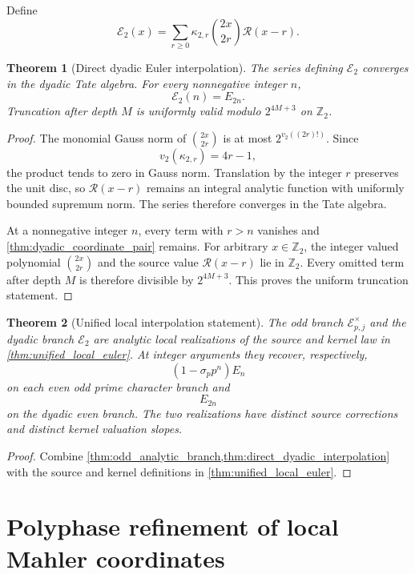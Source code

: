 \documentclass{aomart}
\newtheorem{theorem}{Theorem}[section]
\theoremstyle{definition}
\theoremstyle{remark}
\newcommand{\vTwo}{v_2}
\begin{document}
Define
\[
\boxed{
\mathscr E_2(x)
=
\sum_{r\geq0}
\kappa_{2,r}
\binom{2x}{2r}
\mathscr R(x-r).
}
\]

\begin{theorem}[Direct dyadic Euler interpolation]\label{thm:direct_dyadic_interpolation}
The series defining \(\mathscr E_2\) converges in the dyadic Tate algebra. For every nonnegative integer \(n\),
\[
\boxed{\mathscr E_2(n)=E_{2n}.}
\]
Truncation after depth \(M\) is uniformly valid modulo \(2^{4M+3}\) on \(\mathbb Z_2\).
\end{theorem}

\begin{proof}
The monomial Gauss norm of \(\binom{2x}{2r}\) is at most \(2^{\vTwo((2r)!)}\). Since
\[
\vTwo(\kappa_{2,r})=4r-1,
\]
the product tends to zero in Gauss norm. Translation by the integer \(r\) preserves the unit disc, so \(\mathscr R(x-r)\) remains an integral analytic function with uniformly bounded supremum norm. The series therefore converges in the Tate algebra.

At a nonnegative integer \(n\), every term with \(r>n\) vanishes and \cref{thm:dyadic_coordinate_pair} remains. For arbitrary \(x\in\mathbb Z_2\), the integer valued polynomial \(\binom{2x}{2r}\) and the source value \(\mathscr R(x-r)\) lie in \(\mathbb Z_2\). Every omitted term after depth \(M\) is therefore divisible by \(2^{4M+3}\). This proves the uniform truncation statement.
\end{proof}

\begin{theorem}[Unified local interpolation statement]\label{thm:unified_local_interpolation}
The odd branch \(\mathscr E_{p,j}^\times\) and the dyadic branch \(\mathscr E_2\) are analytic local realizations of the source and kernel law in \cref{thm:unified_local_euler}. At integer arguments they recover, respectively,
\[
\left(1-\sigma_pp^n\right)E_n
\]
on each even odd prime character branch and
\[
E_{2n}
\]
on the dyadic even branch. The two realizations have distinct source corrections and distinct kernel valuation slopes.
\end{theorem}

\begin{proof}
Combine \cref{thm:odd_analytic_branch,thm:direct_dyadic_interpolation} with the source and kernel definitions in \cref{thm:unified_local_euler}.
\end{proof}

\section{Polyphase refinement of local Mahler coordinates}\label{sec:polyphase}
\end{document}
